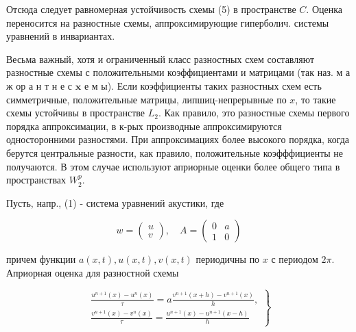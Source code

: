 \documentclass[10pt]{article}
\begin{document}
Отсюда следует равномерная устойчивость схемы (5) в пространстве $C$. Оценка переносится на разностные схемы, аппроксимирующие гиперболич. системы уравнений в инвариантах.



Весьма важный, хотя и ограниченный класс разностных схем составляют разностные схемы с положительными коэффициентами и матрицами (так наз. м а ж ор а н т н е с $\mathbf{x}$ е м ы). Если коэффициенты таких разностных схем есть симметричные, положительные матрицы, липшиц-непрерывные по $x$, то такие схемы устойчивы в пространстве $L_{2}$. Как правило, это разностные схемы первого порядка аппроксимации, в к-рых производные аппроксимируются односторонними разностями. При аппроксимациях более высокого порядка, когда берутся центральные разности, как правило, положительные коэфффициенты не получаются. В этом случае используют априорные оценки более общего типа в пространствах $W_{2}^{p}$.



Пусть, напр., (1) - система уравнений акустики, где



\[

w=\left(\begin{array}{l}

u \\

v

\end{array}\right), \quad A=\left(\begin{array}{ll}

0 & a \\

1 & 0

\end{array}\right)

\]



причем функции $a(x, t), u(x, t), v(x, t)$ периодичны по $x$ с периодом $2 \pi$. Априорная оценка для разностной схемы



\[

\left.\begin{array}{l}

\frac{u^{n+1}(x)-u^{n}(x)}{\tau}=a \frac{v^{n+1}(x+h)-v^{n+1}(x)}{h}, \\

\frac{v^{n+1}(x)-v^{n}(x)}{\tau}=\frac{u^{n+1}(x)-u^{n+1}(x-h)}{h}

\end{array}\right\}

\]
\end{document}
